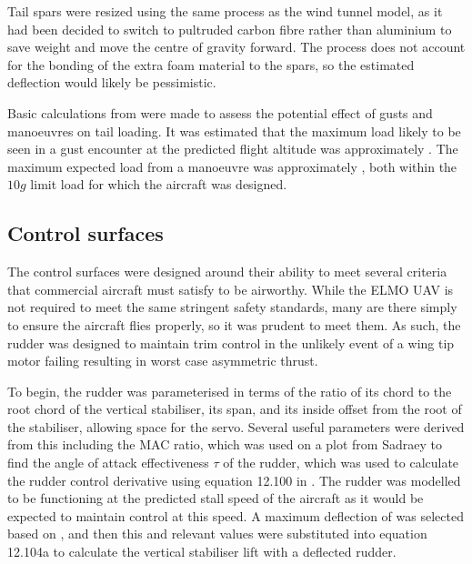 \documentclass[../../main.tex]{subfiles}
\begin{document}
Tail spars were resized using the same process as the wind tunnel model, as it had been decided to switch to pultruded carbon fibre rather than aluminium to save weight and move the centre of gravity forward.
The process does not account for the bonding of the extra foam material to the spars, so the estimated deflection would likely be pessimistic.  

Basic calculations from \cite{bresloff-18} were made to assess the potential effect of gusts and manoeuvres on tail loading.
It was estimated that the maximum load likely to be seen in a gust encounter at the predicted flight altitude was approximately .
The maximum expected load from a manoeuvre was approximately , both within the $10g$ limit load for which the aircraft was designed. 

\subsection{Control surfaces} \label{sec:design-process:revised-design:control-surfaces}

The control surfaces were designed around their ability to meet several criteria that commercial aircraft must satisfy to be airworthy.
While the ELMO UAV is not required to meet the same stringent safety standards, many are there simply to ensure the aircraft flies properly, so it was prudent to meet them.
As such, the rudder was designed to maintain trim control in the unlikely event of a wing tip motor failing resulting in worst case asymmetric thrust.  

To begin, the rudder was parameterised in terms of the ratio of its chord to the root chord of the vertical stabiliser, its span, and its inside offset from the root of the stabiliser, allowing space for the servo.
Several useful parameters were derived from this including the MAC ratio, which was used on a plot from Sadraey \cite{sadraey-13} to find the angle of attack effectiveness $\tau$ of the rudder, which was used to calculate the rudder control derivative using equation 12.100 in \cite{sadraey-13}.
The rudder was modelled to be functioning at the predicted stall speed of the aircraft as it would be expected to maintain control at this speed.
A maximum deflection of  was selected based on \cite{sadraey-13}, and then this and relevant values were substituted into equation 12.104a \cite{sadraey-13} to calculate the vertical stabiliser lift with a deflected rudder. 
\end{document}
